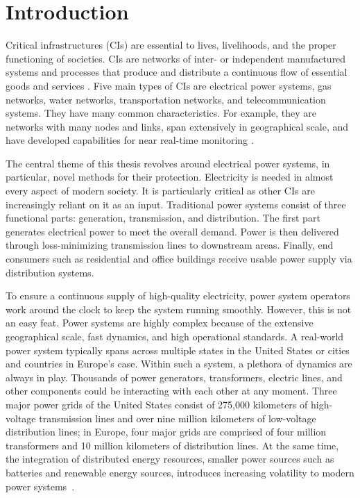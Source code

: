 
\chapter{Introduction}
\label{ch:introduction}
\vspace{2em}


Critical infrastructures (CIs) are essential to lives, livelihoods, and the proper functioning of societies. CIs are networks of inter- or independent manufactured systems and processes that produce and distribute a continuous flow of essential goods and services \cite{ellis1997report}. Five main types of CIs are electrical power systems, gas networks, water networks, transportation networks, and telecommunication systems. They have many common characteristics. For example, they are networks with many nodes and links, span extensively in geographical scale, and have developed capabilities for near real-time monitoring \cite{guikema2009natural}.

The central theme of this thesis revolves around electrical power systems, in particular, novel methods for their protection. Electricity is needed in almost every aspect of modern society. It is particularly critical as other CIs are increasingly reliant on it as an input. Traditional power systems consist of three functional parts: generation, transmission, and distribution. The first part generates electrical power to meet the overall demand. Power is then delivered through loss-minimizing transmission lines to downstream areas. Finally, end consumers such as residential and office buildings receive usable power supply via distribution systems.

To ensure a continuous supply of high-quality electricity, power system operators work around the clock to keep the system running smoothly. However, this is not an easy feat. Power systems are highly complex because of the extensive geographical scale, fast dynamics, and high operational standards. A real-world power system typically spans across multiple states in the United States or cities and countries in Europe’s case. Within such a system, a plethora of dynamics are always in play. Thousands of power generators, transformers, electric lines, and other components could be interacting with each other at any moment. Three major power grids of the United States consist of 275,000 kilometers of high-voltage transmission lines and over nine million kilometers of low-voltage distribution lines; in Europe, four major grids are comprised of four million transformers and 10 million kilometers of distribution lines. At the same time, the integration of distributed energy resources, smaller power sources such as batteries and renewable energy sources, introduces increasing volatility to modern power systems~\cite{amin2008challenges}.

